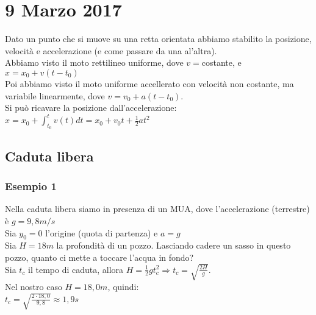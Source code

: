 \documentclass{article}
\begin{document}
\section*{9 Marzo 2017}
Dato un punto che si muove su una retta orientata abbiamo stabilito la 
posizione, velocit\`{a} e accelerazione (e come passare da una al'altra).\\
Abbiamo visto il moto rettilineo uniforme, dove $v=$costante, e $x = x_0 + v(t-t_0)$\\
Poi abbiamo visto il moto uniforme accellerato con velocit\`{a} non costante, ma variabile linearmente, dove $v=v_0+a(t-t_0)$.\\
Si pu\`{o} ricavare la posizione dall'accelerazione:\\
$x=x_0+\int_{t_0}^t v(t)dt=x_0+v_0t+\frac{1}{2}at^2$\\
\subsection*{Caduta libera}
\subsubsection*{Esempio 1}
Nella caduta libera siamo in presenza di un MUA, dove l'accelerazione 
(terrestre) \`{e} $g=9,8m\slash s$\\
Sia $y_0=0$ l'origine (quota di partenza) e $a=g$\\
Sia $H=18m$ la profondit\`{a} di un pozzo. Lasciando cadere un sasso
in questo pozzo, quanto ci mette a toccare l'acqua in fondo?\\
Sia $t_c$ il tempo di caduta, allora $H=\frac{1}{2}gt_c^2\Rightarrow 
t_c=\sqrt{\frac{2H}{g}}$.\\
Nel nostro caso $H=18,0m$, quindi:\\
$t_c=\sqrt{\frac{2\cdot 18,0}{9,8}}\approx1,9 s$\\
\end{document}
